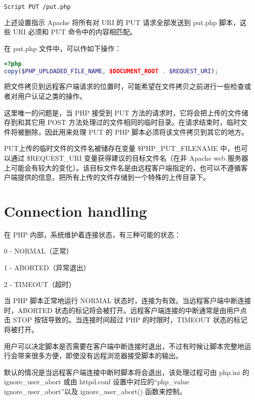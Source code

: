\begin{lstlisting}[language=bash]
Script PUT /put.php
\end{lstlisting}

上述设置指示 Apache 将所有对 URI 的 PUT 请求全部发送到 put.php 脚本，这些 URI 必须和 PUT 命令中的内容相匹配。

在 put.php 文件中，可以作如下操作：

\begin{lstlisting}[language=PHP]
<?php
copy($PHP_UPLOADED_FILE_NAME, $DOCUMENT_ROOT . $REQUEST_URI);
\end{lstlisting}

把文件拷贝到远程客户端请求的位置时，可能希望在文件拷贝之前进行一些检查或者对用户认证之类的操作。

这里唯一的问题是，当 PHP 接受到 PUT 方法的请求时，它将会把上传的文件储存到和其它用 POST 方法处理过的文件相同的临时目录。在请求结束时，临时文件将被删除，因此用来处理 PUT 的 PHP 脚本必须将该文件拷贝到其它的地方。

PUT上传的临时文件的文件名被储存在变量 \$PHP\_PUT\_FILENAME 中，也可以通过 \$REQUEST\_URI 变量获得建议的目标文件名（在非 Apache web 服务器上可能会有较大的变化）。该目标文件名是由远程客户端指定的，也可以不遵循客户端提供的信息，把所有上传的文件存储到一个特殊的上传目录下。

\section{Connection handling}

在 PHP 内部，系统维护着连接状态，有三种可能的状态：

\begin{compactitem}
\item 0 - NORMAL（正常）
\item 1 - ABORTED（异常退出）
\item 2 - TIMEOUT（超时）
\end{compactitem}

当 PHP 脚本正常地运行 NORMAL 状态时，连接为有效。当远程客户端中断连接时，ABORTED 状态的标记将会被打开。远程客户端连接的中断通常是由用户点击 STOP 按钮导致的。当连接时间超过 PHP 的时限时，TIMEOUT 状态的标记将被打开。

用户可以决定脚本是否需要在客户端中断连接时退出，不过有时候让脚本完整地运行会带来很多方便，即使没有远程浏览器接受脚本的输出。

默认的情况是当远程客户端连接中断时脚本将会退出，该处理过程可由 php.ini 的 ignore\_user\_abort 或由 httpd.conf 设置中对应的“php\_value ignore\_user\_abort”以及 ignore\_user\_abort() 函数来控制。

